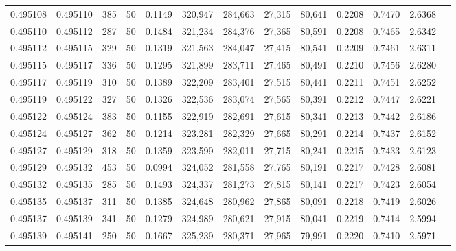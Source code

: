 \begin{tabular}{rrrrrrrrrrrrr}
0.495108 & 0.495110 &   385 &  50 &                                     0.1149 & 320,947 & 284,663 &  27,315 &  80,641 & 0.2208 & 0.7470 & 2.6368 \\
0.495110 & 0.495112 &   287 &  50 &                                     0.1484 & 321,234 & 284,376 &  27,365 &  80,591 & 0.2208 & 0.7465 & 2.6342 \\
0.495112 & 0.495115 &   329 &  50 &                                     0.1319 & 321,563 & 284,047 &  27,415 &  80,541 & 0.2209 & 0.7461 & 2.6311 \\
0.495115 & 0.495117 &   336 &  50 &                                     0.1295 & 321,899 & 283,711 &  27,465 &  80,491 & 0.2210 & 0.7456 & 2.6280 \\
0.495117 & 0.495119 &   310 &  50 &                                     0.1389 & 322,209 & 283,401 &  27,515 &  80,441 & 0.2211 & 0.7451 & 2.6252 \\
0.495119 & 0.495122 &   327 &  50 &                                     0.1326 & 322,536 & 283,074 &  27,565 &  80,391 & 0.2212 & 0.7447 & 2.6221 \\
0.495122 & 0.495124 &   383 &  50 &                                     0.1155 & 322,919 & 282,691 &  27,615 &  80,341 & 0.2213 & 0.7442 & 2.6186 \\
0.495124 & 0.495127 &   362 &  50 &                                     0.1214 & 323,281 & 282,329 &  27,665 &  80,291 & 0.2214 & 0.7437 & 2.6152 \\
0.495127 & 0.495129 &   318 &  50 &                                     0.1359 & 323,599 & 282,011 &  27,715 &  80,241 & 0.2215 & 0.7433 & 2.6123 \\
0.495129 & 0.495132 &   453 &  50 &                                     0.0994 & 324,052 & 281,558 &  27,765 &  80,191 & 0.2217 & 0.7428 & 2.6081 \\
0.495132 & 0.495135 &   285 &  50 &                                     0.1493 & 324,337 & 281,273 &  27,815 &  80,141 & 0.2217 & 0.7423 & 2.6054 \\
0.495135 & 0.495137 &   311 &  50 &                                     0.1385 & 324,648 & 280,962 &  27,865 &  80,091 & 0.2218 & 0.7419 & 2.6026 \\
0.495137 & 0.495139 &   341 &  50 &                                     0.1279 & 324,989 & 280,621 &  27,915 &  80,041 & 0.2219 & 0.7414 & 2.5994 \\
0.495139 & 0.495141 &   250 &  50 &                                     0.1667 & 325,239 & 280,371 &  27,965 &  79,991 & 0.2220 & 0.7410 & 2.5971 \\

\end{tabular}
